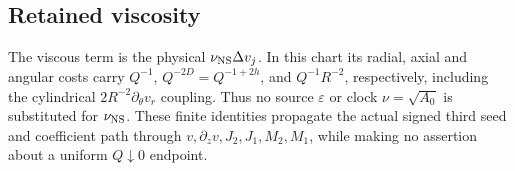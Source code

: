 \subsection{Retained viscosity}
The viscous term is the physical \(\nu_{\rm NS}\Delta v_j\).  In this chart
its radial, axial and angular costs carry \(Q^{-1}\), \(Q^{-2D}=Q^{-1+2h}\),
and \(Q^{-1}R^{-2}\), respectively, including the cylindrical
\(2R^{-2}\partial_\theta v_r\) coupling.  Thus no source \(\varepsilon\)
or clock \(\nu=\sqrt{A_0}\) is substituted for \(\nu_{\rm NS}\).  These
finite identities propagate the actual signed third seed and coefficient
path through \(v,\partial_zv,J_2,J_1,M_2,M_1\), while making no assertion
about a uniform \(Q\downarrow0\) endpoint.
\label{qext:conclusion}
